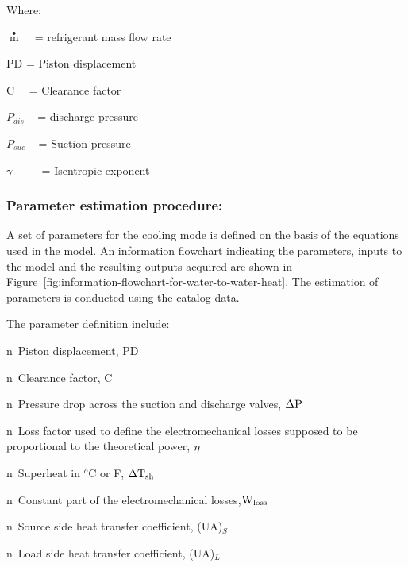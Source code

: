 Where:

\(\mathop m\limits^ \bullet\) ~ = refrigerant mass flow rate

PD = Piston displacement

C~~ = Clearance factor

\(P{}_{dis}\) ~ = discharge pressure

\(P{}_{suc}\) ~ = Suction pressure

\(\gamma\) ~~~~ = Isentropic exponent

\subsubsection{Parameter estimation procedure:}\label{parameter-estimation-procedure}

A set of parameters for the cooling mode is defined on the basis of the equations used in the model. An information flowchart indicating the parameters, inputs to the model and the resulting outputs acquired are shown in Figure~\ref{fig:information-flowchart-for-water-to-water-heat}. The estimation of parameters is conducted using the catalog data.

The parameter definition include:

n~Piston displacement, PD

n~Clearance factor, C

n~Pressure drop across the suction and discharge valves, \({\rm{\Delta P}}\)

n~Loss factor used to define the electromechanical losses supposed to be proportional to the theoretical power, \({\rm{\eta }}\)

n~Superheat in \(^{ο}\)C or F, \({\rm{\Delta T}}{}_{{\rm{sh}}}\)

n~Constant part of the electromechanical losses,\({\rm{W}}{}_{{\rm{loss}}}\)

n~Source side heat transfer coefficient, (UA)\(_{S}\)

n~Load side heat transfer coefficient, (UA)\(_{L}\)

